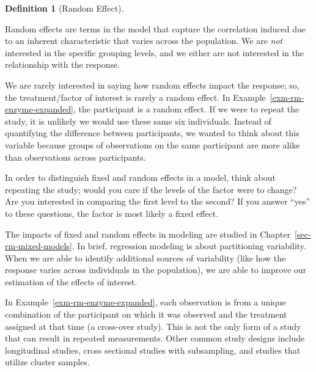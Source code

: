 \documentclass[
  letterpaper,
  DIV=11,
  numbers=noendperiod]{scrreprt}
\theoremstyle{definition}
\newtheorem{definition}{Definition}[chapter]
\theoremstyle{definition}
\theoremstyle{remark}
\begin{document}
\begin{definition}[Random
Effect]\protect\hypertarget{def-random-effect}{}\label{def-random-effect}

Random effects are terms in the model that capture the correlation
induced due to an inherent characteristic that varies across the
population. We are \emph{not} interested in the specific grouping
levels, and we either are not interested in the relationship with the
response.

\end{definition}

We are rarely interested in saying how random effects impact the
response; so, the treatment/factor of interest is rarely a random
effect. In Example~\ref{exm-rm-enzyme-expanded}, the participant is a
random effect. If we were to repeat the study, it is unlikely we would
use these same six individuals. Instead of quantifying the difference
between participants, we wanted to think about this variable because
groups of observations on the same participant are more alike than
observations across participants.

\begin{tcolorbox}[enhanced jigsaw, left=2mm, toprule=.15mm, arc=.35mm, breakable, opacitybacktitle=0.6, opacityback=0, rightrule=.15mm, colbacktitle=quarto-callout-note-color!10!white, coltitle=black, leftrule=.75mm, toptitle=1mm, colframe=quarto-callout-note-color-frame, titlerule=0mm, title=\textcolor{quarto-callout-note-color}{\faInfo}\hspace{0.5em}{Note}, bottomrule=.15mm, colback=white, bottomtitle=1mm]

In order to distinguish fixed and random effects in a model, think about
repeating the study; would you care if the levels of the factor were to
change? Are you interested in comparing the first level to the second?
If you answer ``yes'' to these questions, the factor is most likely a
fixed effect.

\end{tcolorbox}

The impacts of fixed and random effects in modeling are studied in
Chapter~\ref{sec-rm-mixed-models}. In brief, regression modeling is
about partitioning variability. When we are able to identify additional
sources of variability (like how the response varies across individuals
in the population), we are able to improve our estimation of the effects
of interest.

In Example~\ref{exm-rm-enzyme-expanded}, each observation is from a
unique combination of the participant on which it was observed and the
treatment assigned at that time (a cross-over study). This is not the
only form of a study that can result in repeated measurements. Other
common study designs include longitudinal studies, cross sectional
studies with subsampling, and studies that utilize cluster samples.
\end{document}

